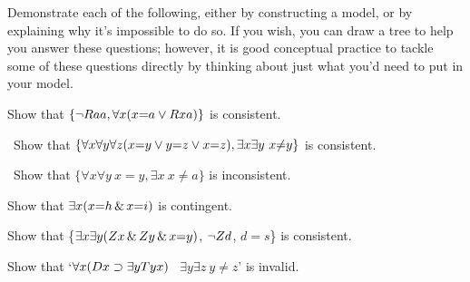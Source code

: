\solutions
\problempart Demonstrate each of the following, either by constructing a model, or by explaining why it's impossible to do so. If you wish, you can draw a tree to help you answer these questions; however, it is good conceptual practice to tackle some of these questions directly by thinking about just what you'd need to put in your model.
\label{pr.IdentityModels}
\begin{earg}
\item Show that $\{{\neg}Raa, \forall x (x{=}a \vee Rxa)\}$
is consistent.
\item\ Show that $\{\forall x\forall y\forall z(x{=}y \vee y{=}z \vee x{=}z),
\exists x\exists y\ x{\neq} y\}$ is consistent.
\item\ Show that $\{\forall x\forall y\ x{=}y, \exists x\ x {\neq} a\}$ is inconsistent.
\item Show that $\exists x (x {=} h \,\&\, x {=} i)$ is contingent.
\item Show that \{$\exists x\exists y(Zx \,\&\, Zy \,\&\, x{=}y)$, $\neg Zd$, $d{=}s$\} is consistent.
\item Show that `$\forall x(Dx \supset \exists y Tyx)$ \therefore\ $\exists y \exists z\ y{\neq} z$' is invalid.
\end{earg}

